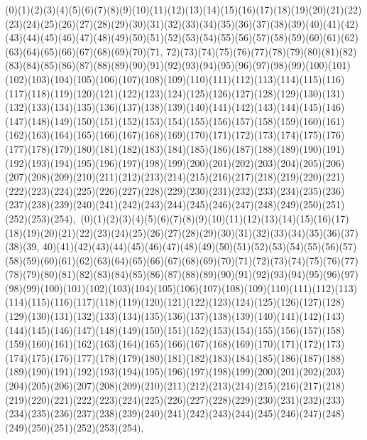 \documentclass[12pt]{article}
\begin{document}
{(0)(1)(2)(3)(4)(5)(6)(7)(8)(9)(10)(11)(12)(13)(14)(15)(16)(17)(18)(19)(20)(21)(22)(23)(24)(25)(26)(27)(28)(29)(30)(31)(32)(33)(34)(35)(36)(37)(38)(39)(40)(41)(42)(43)(44)(45)(46)(47)(48)(49)(50)(51)(52)(53)(54)(55)(56)(57)(58)(59)(60)(61)(62)(63)(64)(65)(66)(67)(68)(69)(70)(71, 72)(73)(74)(75)(76)(77)(78)(79)(80)(81)(82)(83)(84)(85)(86)(87)(88)(89)(90)(91)(92)(93)(94)(95)(96)(97)(98)(99)(100)(101)(102)(103)(104)(105)(106)(107)(108)(109)(110)(111)(112)(113)(114)(115)(116)(117)(118)(119)(120)(121)(122)(123)(124)(125)(126)(127)(128)(129)(130)(131)(132)(133)(134)(135)(136)(137)(138)(139)(140)(141)(142)(143)(144)(145)(146)(147)(148)(149)(150)(151)(152)(153)(154)(155)(156)(157)(158)(159)(160)(161)(162)(163)(164)(165)(166)(167)(168)(169)(170)(171)(172)(173)(174)(175)(176)(177)(178)(179)(180)(181)(182)(183)(184)(185)(186)(187)(188)(189)(190)(191)(192)(193)(194)(195)(196)(197)(198)(199)(200)(201)(202)(203)(204)(205)(206)(207)(208)(209)(210)(211)(212)(213)(214)(215)(216)(217)(218)(219)(220)(221)(222)(223)(224)(225)(226)(227)(228)(229)(230)(231)(232)(233)(234)(235)(236)(237)(238)(239)(240)(241)(242)(243)(244)(245)(246)(247)(248)(249)(250)(251)(252)(253)(254)$
, 
$
(0)(1)(2)(3)(4)(5)(6)(7)(8)(9)(10)(11)(12)(13)(14)(15)(16)(17)(18)(19)(20)(21)(22)(23)(24)(25)(26)(27)(28)(29)(30)(31)(32)(33)(34)(35)(36)(37)(38)(39, 40)(41)(42)(43)(44)(45)(46)(47)(48)(49)(50)(51)(52)(53)(54)(55)(56)(57)(58)(59)(60)(61)(62)(63)(64)(65)(66)(67)(68)(69)(70)(71)(72)(73)(74)(75)(76)(77)(78)(79)(80)(81)(82)(83)(84)(85)(86)(87)(88)(89)(90)(91)(92)(93)(94)(95)(96)(97)(98)(99)(100)(101)(102)(103)(104)(105)(106)(107)(108)(109)(110)(111)(112)(113)(114)(115)(116)(117)(118)(119)(120)(121)(122)(123)(124)(125)(126)(127)(128)(129)(130)(131)(132)(133)(134)(135)(136)(137)(138)(139)(140)(141)(142)(143)(144)(145)(146)(147)(148)(149)(150)(151)(152)(153)(154)(155)(156)(157)(158)(159)(160)(161)(162)(163)(164)(165)(166)(167)(168)(169)(170)(171)(172)(173)(174)(175)(176)(177)(178)(179)(180)(181)(182)(183)(184)(185)(186)(187)(188)(189)(190)(191)(192)(193)(194)(195)(196)(197)(198)(199)(200)(201)(202)(203)(204)(205)(206)(207)(208)(209)(210)(211)(212)(213)(214)(215)(216)(217)(218)(219)(220)(221)(222)(223)(224)(225)(226)(227)(228)(229)(230)(231)(232)(233)(234)(235)(236)(237)(238)(239)(240)(241)(242)(243)(244)(245)(246)(247)(248)(249)(250)(251)(252)(253)(254)$
, 
$
}
\end{document}

